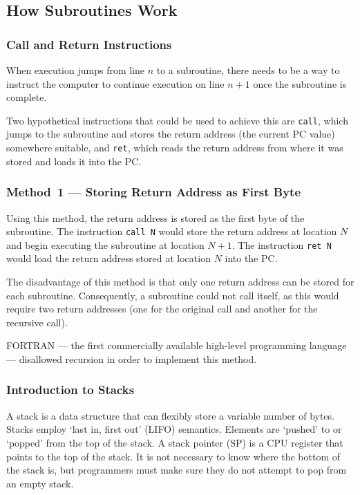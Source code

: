 \subsection{How Subroutines Work}

\subsubsection{Call and Return Instructions}

When execution jumps from line \( n \) to a subroutine, there needs to be a way to instruct the computer to continue execution on line \( n + 1 \) once the subroutine is complete.

Two hypothetical instructions that could be used to achieve this are \texttt{call}, which jumps to the subroutine and stores the return address (the current PC value) somewhere suitable, and \texttt{ret}, which reads the return address from where it was stored and loads it into the PC.

\subsubsection{Method~1 --- Storing Return Address as First Byte}

Using this method, the return address is stored as the first byte of the subroutine.
The instruction \texttt{call N} would store the return address at location \( N \) and begin executing the subroutine at location \( N + 1 \).
The instruction \texttt{ret N} would load the return address stored at location \( N \) into the PC.

The disadvantage of this method is that only one return address can be stored for each subroutine.
Consequently, a subroutine could not call itself, as this would require two return addresses (one for the original call and another for the recursive call).

FORTRAN --- the first commercially available high-level programming language --- disallowed recursion in order to implement this method.

\subsubsection{Introduction to Stacks}

A stack is a data structure that can flexibly store a variable number of bytes.
Stacks employ `last in, first out' (LIFO) semantics.
Elements are `pushed' to or `popped' from the top of the stack.
A stack pointer (SP) is a CPU register that points to the top of the stack.
It is not necessary to know where the bottom of the stack is, but programmers must make sure they do not attempt to pop from an empty stack.

